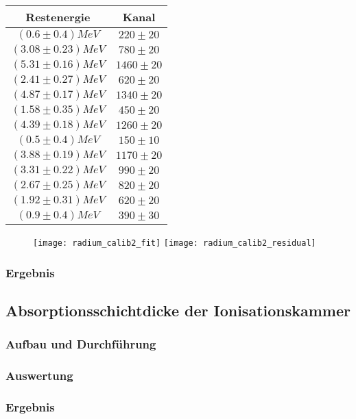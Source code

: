 \documentclass{../Misc/MontavonLaTeX/Montavon}
\newcommand{\halfwidth}{0.48\textwidth}
\begin{document}
\begin{table}[htbp]
\centering
\begin{tabular}{|c|c|}
\hline
Restenergie & Kanal \\
\hline
$(0.6 \pm 0.4) \unit{MeV}$ & $220 \pm 20$ \\
$(3.08 \pm 0.23) \unit{MeV}$ & $780 \pm 20$ \\
$(5.31 \pm 0.16) \unit{MeV}$ & $1460 \pm 20$ \\
$(2.41 \pm 0.27) \unit{MeV}$ & $620 \pm 20$ \\
$(4.87 \pm 0.17) \unit{MeV}$ & $1340 \pm 20$ \\
$(1.58 \pm 0.35) \unit{MeV}$ & $450 \pm 20$ \\
$(4.39 \pm 0.18) \unit{MeV}$ & $1260 \pm 20$ \\
$(0.5 \pm 0.4) \unit{MeV}$ & $150 \pm 10$ \\
$(3.88 \pm 0.19) \unit{MeV}$ & $1170 \pm 20$ \\
$(3.31 \pm 0.22) \unit{MeV}$ & $990 \pm 20$ \\
$(2.67 \pm 0.25) \unit{MeV}$ & $820 \pm 20$ \\
$(1.92 \pm 0.31) \unit{MeV}$ & $620 \pm 20$ \\
$(0.9 \pm 0.4) \unit{MeV}$ & $390 \pm 30$ \\
\hline
\end{tabular}
\end{table}

\begin{figure}[htbp]
\texttt{[image: radium\_calib2\_fit]}
\texttt{[image: radium\_calib2\_residual]}
\end{figure}

\subsubsection{Ergebnis}

\subsection{Absorptionsschichtdicke der Ionisationskammer}
\subsubsection{Aufbau und Durchführung}
\subsubsection{Auswertung}
\subsubsection{Ergebnis}
\end{document}
